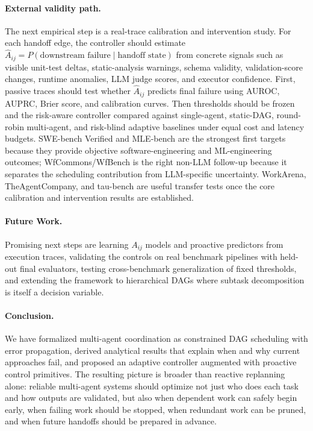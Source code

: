 \documentclass[10pt, twocolumn]{article}
\begin{document}
\paragraph{External validity path.}
The next empirical step is a real-trace calibration and intervention study. For each handoff edge, the controller should estimate $\hat{A}_{ij}=P(\text{downstream failure}\mid\text{handoff state})$ from concrete signals such as visible unit-test deltas, static-analysis warnings, schema validity, validation-score changes, runtime anomalies, LLM judge scores, and executor confidence. First, passive traces should test whether $\hat{A}_{ij}$ predicts final failure using AUROC, AUPRC, Brier score, and calibration curves. Then thresholds should be frozen and the risk-aware controller compared against single-agent, static-DAG, round-robin multi-agent, and risk-blind adaptive baselines under equal cost and latency budgets. SWE-bench Verified and MLE-bench are the strongest first targets because they provide objective software-engineering and ML-engineering outcomes; WfCommons/WfBench is the right non-LLM follow-up because it separates the scheduling contribution from LLM-specific uncertainty. WorkArena, TheAgentCompany, and tau-bench are useful transfer tests once the core calibration and intervention results are established.

\paragraph{Future Work.}
Promising next steps are learning $A_{ij}$ models and proactive predictors from execution traces, validating the controls on real benchmark pipelines with held-out final evaluators, testing cross-benchmark generalization of fixed thresholds, and extending the framework to hierarchical DAGs where subtask decomposition is itself a decision variable.

\paragraph{Conclusion.}
We have formalized multi-agent coordination as constrained DAG scheduling with error propagation, derived analytical results that explain when and why current approaches fail, and proposed an adaptive controller augmented with proactive control primitives. The resulting picture is broader than reactive replanning alone: reliable multi-agent systems should optimize not just who does each task and how outputs are validated, but also when dependent work can safely begin early, when failing work should be stopped, when redundant work can be pruned, and when future handoffs should be prepared in advance.



\end{document}

